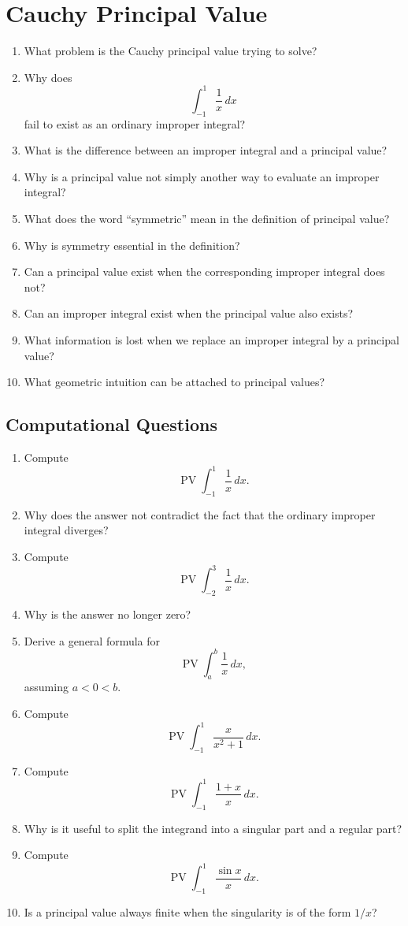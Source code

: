 \section{Cauchy Principal Value}

\begin{enumerate}
  \item What problem is the Cauchy principal value trying to solve?
  \item Why does
    \[
      \int_{-1}^{1}\frac{1}{x}\,dx
    \]
    fail to exist as an ordinary improper integral?
  \item What is the difference between an improper integral and a principal value?
  \item Why is a principal value not simply another way to evaluate an improper integral?
  \item What does the word ``symmetric'' mean in the definition of principal value?
  \item Why is symmetry essential in the definition?
  \item Can a principal value exist when the corresponding improper integral does not?
  \item Can an improper integral exist when the principal value also exists?
  \item What information is lost when we replace an improper integral by a principal value?
  \item What geometric intuition can be attached to principal values?
\end{enumerate}

\subsection{Computational Questions}

\begin{enumerate}[resume]
  \item Compute
    \[
      \operatorname{PV}\int_{-1}^{1}\frac{1}{x}\,dx.
    \]
  \item Why does the answer not contradict the fact that the ordinary improper integral diverges?
  \item Compute
    \[
      \operatorname{PV}\int_{-2}^{3}\frac{1}{x}\,dx.
    \]
  \item Why is the answer no longer zero?
  \item Derive a general formula for
    \[
      \operatorname{PV}\int_a^b\frac{1}{x}\,dx,
    \]
    assuming \(a<0<b\).
  \item Compute
    \[
      \operatorname{PV}\int_{-1}^{1}\frac{x}{x^2+1}\,dx.
    \]
  \item Compute
    \[
      \operatorname{PV}\int_{-1}^{1}\frac{1+x}{x}\,dx.
    \]
  \item Why is it useful to split the integrand into a singular part and a regular part?
  \item Compute
    \[
      \operatorname{PV}\int_{-1}^{1}\frac{\sin x}{x}\,dx.
    \]
  \item Is a principal value always finite when the singularity is of the form \(1/x\)?
\end{enumerate}

